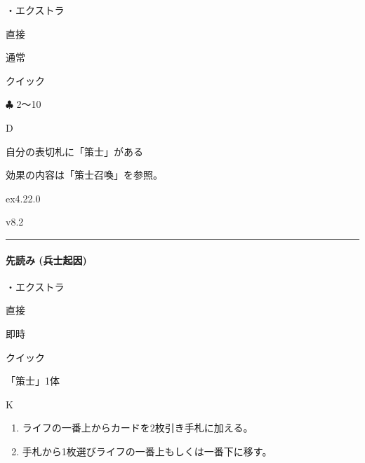 \documentclass[letterpaper,10pt,dvipdfmx]{sphinxmanual}
\begin{document}
\sphinxAtStartPar
・エクストラ

\sphinxAtStartPar
{} 直接

\sphinxAtStartPar
{} 通常

\sphinxAtStartPar
{} クイック

\sphinxAtStartPar
{} {\normalsize $\clubsuit$} 2〜10

\sphinxAtStartPar
{} D

\sphinxAtStartPar
{}

\sphinxAtStartPar
自分の表切札に「策士」がある

\sphinxAtStartPar
{}

\sphinxAtStartPar
効果の内容は「策士召喚」を参照。

\sphinxAtStartPar
{}  ex4.22.0

\sphinxAtStartPar
{}  v8.2


\bigskip\hrule\bigskip



\paragraph{先読み (兵士起因)}
\label{\detokenize{auto/frameActionlist:act-strategistpredict}}\label{\detokenize{auto/frameActionlist:id70}}
\sphinxAtStartPar
{}

\sphinxAtStartPar
・エクストラ

\sphinxAtStartPar
{} 直接

\sphinxAtStartPar
{} 即時

\sphinxAtStartPar
{} クイック

\sphinxAtStartPar
{} 「策士」1体

\sphinxAtStartPar
{} K

\sphinxAtStartPar
{}
\begin{enumerate}
%
\item {} 
\sphinxAtStartPar
ライフの一番上からカードを2枚引き手札に加える。

\item {} 
\sphinxAtStartPar
手札から1枚選びライフの一番上もしくは一番下に移す。

\end{enumerate}
\end{document}
